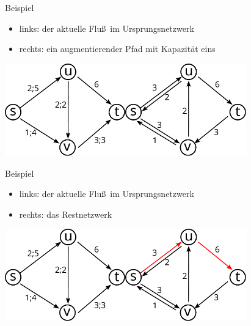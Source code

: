 \documentclass[aspectratio=1610, 11pt]{beamer}
\begin{document}
\begin{frame}
\begin{overprint}
\begin{exampleblock}{Beispiel}
			\begin{itemize}
				\item links: der aktuelle Flu\ss\ im Ursprungsnetzwerk
				\item rechts: ein augmentierender Pfad mit Kapazit\"at eins
			\end{itemize}
		\end{exampleblock}
		\includegraphics[height=40mm]{./images/flow9.pdf}\hfill\includegraphics[height=40mm]{./images/flow10.pdf}
\begin{exampleblock}{Beispiel}
			\begin{itemize}
				\item links: der aktuelle Flu\ss\ im Ursprungsnetzwerk
				\item rechts: das Restnetzwerk
			\end{itemize}
		\end{exampleblock}
		\includegraphics[height=40mm]{./images/flow9.pdf}\hfill\includegraphics[height=40mm]{./images/flow11.pdf}

\end{overprint}
\end{frame}
\end{document}
